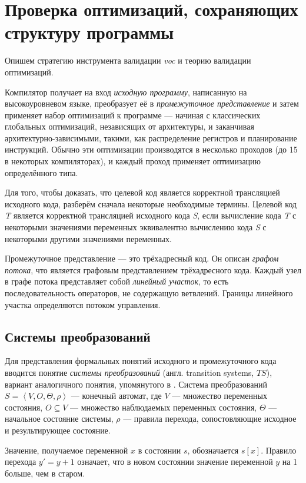\section{Проверка оптимизаций, сохраняющих структуру программы}

Опишем стратегию инструмента валидации \emph{voc} \cite{ZPFG02} и теорию валидации оптимизаций.

Компилятор получает на вход \emph{исходную программу}, написанную на высокоуровневом языке, преобразует её в \emph{промежуточное представление} и затем применяет набор оптимизаций к программе --- начиная с классических глобальных оптимизаций, независящих от архитектуры, и заканчивая архитектурно-зависимыми, такими, как распределение регистров и планирование инструкций. Обычно эти оптимизации производятся в несколько проходов (до 15 в некоторых компиляторах), и каждый проход применяет оптимизацию определённого типа.

Для того, чтобы доказать, что целевой код является корректной трансляцией исходного кода, разберём сначала некоторые необходимые термины. Целевой код \emph{T} является корректной трансляцией исходного кода \emph{S}, если вычисление кода \emph{T} с некоторыми значениями переменных эквивалентно вычислению кода \emph{S} с некоторыми другими значениями переменных.

Промежуточное представление --- это трёхадресный код. Он описан \emph{графом потока}, что является графовым представлением трёхадресного кода. Каждый узел в графе потока представляет собой \emph{линейный участок}, то есть последовательность операторов, не содержащую ветвлений. Границы линейного участка определяются потоком управления.

\subsection{Системы преобразований}

Для представления формальных понятий исходного и промежуточного кода вводится понятие \emph{системы преобразований} (англ. transition systems, $TS$), вариант аналогичного понятия, упомянутого в \cite{PSS98b}. Система преобразований $S = \left\langle  V, O, \Theta, \rho \right\rangle $ --- конечный автомат, где $V$ --- множество переменных состояния, $O \subseteq V$ --- множество наблюдаемых переменных состояния, $\Theta$ --- начальное состояние системы, $\rho$ --- правила перехода, сопостовляющие исходное и результирующее состояние.

Значение, получаемое переменной $x$ в состоянии $s$, обозначается $s[x]$. Правило перехода $y' = y + 1$ означает, что в новом состоянии значение переменной $y$ на 1 больше, чем в старом.

